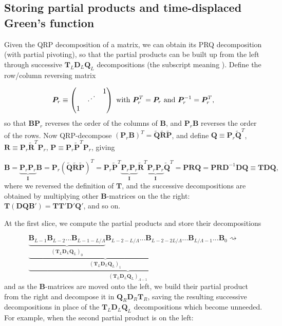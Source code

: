 \subsection{Storing partial products and time-displaced Green's function}
\label{subsec:partial}

Given the QRP decomposition of a matrix, we can obtain its PRQ decomposition (with partial pivoting), so that the partial products can be built up from the left through successive $\bm T_L \bm D_L \bm Q_L$ decompositions (the subscript meaning ).
Define the row/column reversing matrix 

\begin{equation}
\bm P_r \equiv
\begin{pmatrix}
 & & 1 \\
 & \rddots & \\
1& & 
\end{pmatrix}
\,\, \text{with} \,\, \bm P_r^T = \bm P_r \,\, \text{and} \,\, \bm P_r^{-1} = \bm P_r^T ,
\end{equation}
so that $\bm B \bm P_r$ reverses the order of the columns of $\bm B$, and $\bm P_r \bm B$ reverses the order of the rows.
Now QRP-decompose $(\bm P_r \bm B)^T = \tilde{\bm Q} \tilde{\bm R} \tilde{\bm P}$, and define $\bm Q \equiv \bm P_r \tilde{\bm Q}^T$, $\bm R \equiv \bm P_r \tilde{\bm R}^T \bm P_r$, $\bm P \equiv \bm P_r \tilde{\bm P}^T \bm P_r$, giving

\begin{equation}
\bm B = \underbrace{\bm P_r \bm P_r}_{\bm I} \bm B = \bm P_r ( \tilde{\bm Q} \tilde{\bm R} \tilde{\bm P} )^T =  \bm P_r \tilde{\bm P}^T \underbrace{\bm P_r \bm P_r}_{\bm I} \tilde{\bm R}^T \underbrace{\bm P_r \bm P_r}_{\bm I} \tilde{\bm Q}^T = \bm P \bm R \bm Q = \bm P \bm R \bm D^{-1} \bm D \bm Q \equiv \bm T \bm D \bm Q ,
\end{equation}
where we reversed the definition of $\bm T$, and the successive decompositions are obtained by multiplying other $\bm B$-matrices on the the right: $\bm T (\bm D \bm Q \bm B') = \bm T \bm T' \bm D' \bm Q'$, and so on.

At the first slice, we compute the partial products and store their decompositions

\begin{equation}
\underbrace{ \underbrace{ \underbrace{\bm B_{L - 1} \bm B_{L-2} ... \bm B_{L - 1- L / \Lambda}}_{(\bm T_L \bm D_L \bm Q_L)_{0} }  \bm B_{L - 2 - L / \Lambda} ...\bm B_{L - 2 - 2 L / \Lambda} }_{(\bm T_L \bm D_L \bm Q_L)_{1}} ... \bm B_{L / \Lambda - 1} ...  \bm B_0}_{(\bm T_L \bm D_L \bm Q_L)_{\Lambda - 1}} \rightsquigarrow 
\end{equation}
and as the $\bm B$-matrices are moved onto the left, we build their partial product from the right and decompose it in $\bm Q_R \bm D_R \bm T_R$, saving the resulting successive decompositions in place of the $\bm T_L \bm D_L \bm Q_L$ decompositions which become unneeded.
For example, when the second partial product is on the left:

